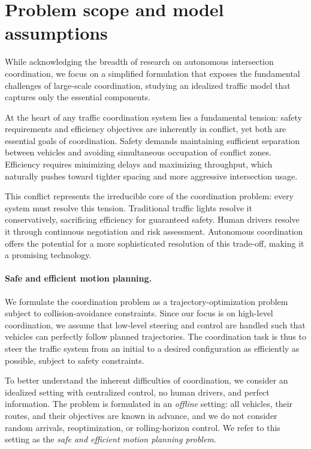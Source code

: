 \documentclass[a4paper]{report}
\theoremstyle{definition}
\theoremstyle{plain}
\begin{document}
\section{Problem scope and model assumptions}

While acknowledging the breadth of research on autonomous intersection
coordination, we focus on a simplified formulation that exposes the fundamental
challenges of large-scale coordination, studying an idealized traffic model that
captures only the essential components.


At the heart of any traffic coordination system lies a fundamental tension:
safety requirements and efficiency objectives are inherently in conflict, yet
both are essential goals of coordination.
%
Safety demands maintaining sufficient separation between vehicles and avoiding
simultaneous occupation of conflict zones.
% 
Efficiency requires minimizing delays and maximizing throughput, which naturally
pushes toward tighter spacing and more aggressive intersection usage.


This conflict represents the irreducible core of the coordination problem: every
system must resolve this tension.
%
Traditional traffic lights resolve it conservatively, sacrificing efficiency for
guaranteed safety.
%
Human drivers resolve it through continuous negotiation and risk assessment.
Autonomous coordination offers the potential for a more sophisticated resolution
of this trade-off, making it a promising technology.

\paragraph{Safe and efficient motion planning.}

We formulate the coordination problem as a trajectory-optimization problem
subject to collision-avoidance constraints.
%
Since our focus is on high-level coordination, we assume that low-level steering
and control are handled such that vehicles can perfectly follow planned
trajectories.
%
The coordination task is thus to steer the traffic system from an initial to a
desired configuration as efficiently as possible, subject to safety constraints.
%

To better understand the inherent difficulties of coordination, we consider an
idealized setting with centralized control, no human drivers, and perfect
information. The problem is formulated in an \emph{offline} setting: all
vehicles, their routes, and their objectives are known in advance, and we do not
consider random arrivals, reoptimization, or rolling-horizon control.
%
We refer to this setting as the \emph{safe and efficient motion planning problem}.
\end{document}
